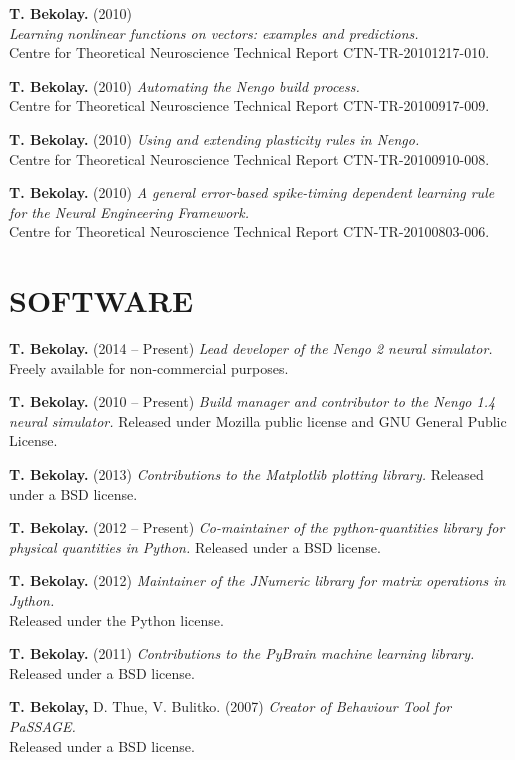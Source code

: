 \documentclass[line,margin]{res}
\begin{document}
\begin{resume}
\textbf{T. Bekolay.} (2010) \\
  {\sl Learning nonlinear functions on vectors: examples and predictions.} \\
  Centre for Theoretical Neuroscience Technical Report CTN-TR-20101217-010.

\textbf{T. Bekolay.} (2010)
  {\sl Automating the Nengo build process.} \\
  Centre for Theoretical Neuroscience Technical Report CTN-TR-20100917-009.

\textbf{T. Bekolay.} (2010)
  {\sl Using and extending plasticity rules in Nengo.} \\
  Centre for Theoretical Neuroscience Technical Report CTN-TR-20100910-008.

\textbf{T. Bekolay.} (2010)
  {\sl A general error-based spike-timing dependent learning rule for
  the Neural Engineering Framework.} \\
  Centre for Theoretical Neuroscience Technical Report CTN-TR-20100803-006.



\section{SOFTWARE}

\textbf{T. Bekolay.} (2014 -- Present)
  {\sl Lead developer of the Nengo 2 neural simulator.}
  Freely available for non-commercial purposes.

\textbf{T. Bekolay.} (2010 -- Present)
  {\sl Build manager and contributor to the Nengo 1.4 neural simulator.}
  Released under Mozilla public license and GNU General Public License.

\textbf{T. Bekolay.} (2013)
  {\sl Contributions to the Matplotlib plotting library.}
  Released under a BSD license.

\textbf{T. Bekolay.} (2012 -- Present)
  {\sl Co-maintainer of the python-quantities library for physical quantities
  in Python.} Released under a BSD license.

\textbf{T. Bekolay.} (2012)
  {\sl Maintainer of the JNumeric library for matrix operations in Jython.} \\
  Released under the Python license.

\textbf{T. Bekolay.} (2011)
  {\sl Contributions to the PyBrain machine learning library.} \\
  Released under a BSD license.

\textbf{T. Bekolay,} D. Thue, V. Bulitko. (2007)
  {\sl Creator of Behaviour Tool for PaSSAGE.} \\
  Released under a BSD license.

\label{LastPage}
\end{resume}
\end{document}
